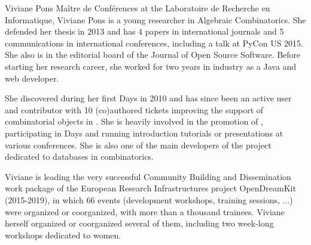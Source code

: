 \begin{participant}[type=PI,PM=1,gender=female]{Viviane Pons}
  Maître de Conférences at the Laboratoire de Recherche en Informatique, Viviane Pons is a
  young researcher in Algebraic Combinatorics. She defended her thesis in 2013 and has 4
  papers in international journals and 5 communications in international
  conferences, including a talk at PyCon US 2015. 
  She also is in the editorial board of the Journal of Open Source Software.
  Before starting her research career,
  she worked for two years in industry as a Java and web developer.

  She discovered \Sage during her first \Sage Days in 2010 and has since been an active user
  and contributor with 10 (co)authored tickets improving the support of combinatorial
  objects in \Sage. She is heavily involved in the promotion of \Sage, participating in
  \Sage Days and running \Sage introduction tutorials or \Sage presentations at various
  conferences. She is also one of the main developers of the project 
  dedicated to databases in combinatorics.

  Viviane is leading the very successful Community Building and
  Dissemination work package of the European Research Infrastructures
  project OpenDreamKit (2015-2019), in which 66 events (development
  workshops, training sessions, ...) were organized or coorganized,
  with more than a thousand trainees. Viviane herself organized or
  coorganized several of them, including two week-long workshops
  dedicated to women.
\end{participant}
